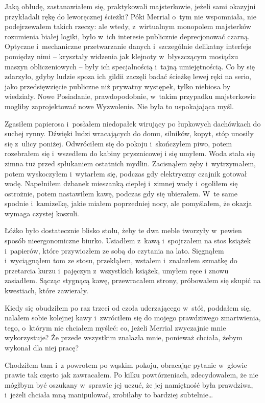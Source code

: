 \documentclass[oneside,polish,11pt,sfheadings]{mwbk}
\begin{document}
Jaką obłudę, zastanawiałem się, praktykowali majsterkowie, jeżeli sami
okazyjni przykładali rękę do leworęcznej ścieżki? Póki Merrial o~tym nie
wspomniała, nie podejrzewałem takich rzeczy: ale wtedy, z~wirtualnym
monopolem majsterków rozumienia białej logiki, było w~ich interesie
publicznie deprecjonować czarną. Optyczne i~mechaniczne przetwarzanie
danych i~szczególnie delikatny interfejs pomiędzy nimi -- kryształy
widzenia jak klejnoty w~błyszczącym mosiądzu maszyn obliczeniowych -- były ich specjalnością i~tajną umiejętnością. Co by się zdarzyło, gdyby
ludzie spoza ich gildii zaczęli badać ścieżkę lewej ręki na serio, jako
przedsięwzięcie publiczne niż prywatny występek, tylko niebiosa by
wiedziały. Nowe Posiadanie, prawdopodobnie, w~takim przypadku
majsterkowie mogliby zaprojektować nowe Wyzwolenie. Nie była to
uspokajająca myśl.

Zgasiłem papierosa i~posłałem niedopałek wirujący po łupkowych
dachówkach do suchej rynny. Dźwięki ludzi wracających do domu, silników,
kopyt, stóp unosiły się z~ulicy poniżej. Odwróciłem się do pokoju i~skończyłem piwo, potem rozebrałem się i~wszedłem do kabiny prysznicowej
i się umyłem. Woda stała się zimna tuż przed spłukaniem ostatnich
mydlin. Zacisnąłem zęby i~wytrzymałem, potem wyskoczyłem i~wytarłem się,
podczas gdy elektryczny czajnik gotował wodę. Napełniłem dzbanek
mieszanką ciepłej i~zimnej wody i~ogoliłem się ostrożnie, potem
nastawiłem kawę, podczas gdy się ubierałem. W~te same spodnie i~kamizelkę, jakie miałem poprzedniej nocy, ale pomyślałem, że okazja
wymaga czystej koszuli.

Łóżko było dostatecznie blisko stołu, żeby te dwa meble tworzyły w~pewien sposób nieergonomiczne biurko. Usiadłem z~kawą i~spojrzałem na
stos książek i~papierów, które przywiozłem ze sobą do czytania na lato.
Sięgnąłem i~wyciągnąłem tom ze stosu, przekląłem, wstałem i~znalazłem
szmatkę do przetarcia kurzu i~pajęczyn z~wszystkich książek, umyłem ręce
i znowu zasiadłem. Sącząc stygnącą kawę, przewracałem strony, próbowałem
się skupić na kwestiach, które zawierały.

Kiedy się obudziłem po raz trzeci od czoła uderzającego w~stół, poddałem
się, nalałem sobie kolejnej kawy i~zwróciłem się do mojego prawdziwego
zmartwienia, tego, o~którym nie chciałem myśleć: co, jeżeli Merrial
zwyczajnie mnie wykorzystuje? Że przede wszystkim znalazła mnie,
ponieważ chciała, żebym wykonał dla niej pracę?

Chodziłem tam i~z powrotem po wąskim pokoju, obracając pytanie w~głowie
prawie tak często jak zawracałem. Po kilku powtórzeniach, zdecydowałem,
że nie mógłbym być oszukany w~sprawie jej uczuć, że jej namiętność była
prawdziwa, i~jeżeli chciała mną manipulować, zrobiłaby to bardziej
subtelnie\ldots
\end{document}

